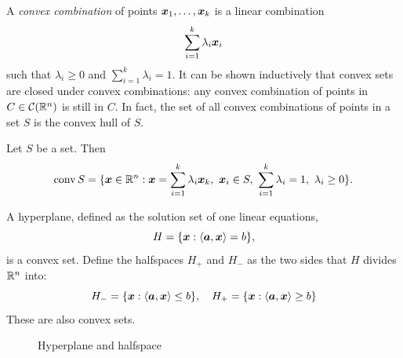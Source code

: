 A {\em convex combination} of points $\bm{x}_1,\dots,\bm{x}_k$ is a linear combination
\begin{equation*}
 \sum_{i=1}^k \lambda_i \bm{x}_i
\end{equation*}
such that $\lambda_i\geq 0$ and $\sum_{i=1}^k \lambda_i = 1$. It can be shown inductively that convex sets are closed under convex combinations: any convex combination of points in $C\in \mathcal{C}(\mathbb{R}^n)$ is still in $C$. In fact, the set of all convex combinations of points in a set $S$ is the convex hull of $S$.

\begin{lemma}
 Let $S$ be a set. Then 
 \begin{equation*}
  \conv{S} = \{\vct{x}\in \R^n \mid \vct{x}=\sum_{i=1}^k \lambda_i \vct{x}_k, \ \vct{x}_i\in S, \ \sum_{i=1}^k \lambda_i = 1, \ \lambda_i\geq 0\}.
 \end{equation*}
\end{lemma}

\begin{example}
A hyperplane, defined as the solution set of one linear equations,
\begin{equation*}
 H = \{\bm{x} \mathrel{\mathop{:}} \langle {\bm{a}}, {\bm{x}} \rangle = b\},
\end{equation*}
is a convex set.
Define the halfspaces $H_+$ and $H_-$ as the two sides that $H$ divides $\mathbb{R}^n$ into:
\begin{equation*}
 H_- = \{\bm{x}\mathrel{\mathop{:}} \langle {\bm{a}}, {\bm{x}} \rangle\leq b\}, \quad H_+ = \{\bm{x}\mathrel{\mathop{:}} \langle {\bm{a}}, {\bm{x}} \rangle\geq b\}
\end{equation*}
These are also convex sets. 
\begin{figure}[h!]
\centering
{}
\caption{Hyperplane and halfspace}
\end{figure}
\end{example}

